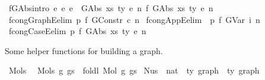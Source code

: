 \begin{isabellebody}
{\isacharbar}{\kern0pt}\ f{\isacharunderscore}{\kern0pt}GAbs{\isacharbrackleft}{\kern0pt}intro{\isacharbrackright}{\kern0pt}{\isacharcolon}{\kern0pt}\ {\isachardoublequoteopen}e{}\ {\isasymsimeq}e\ e{}\ {\isacharequal}{\kern0pt}{\isacharequal}{\kern0pt}{\isachargreater}{\kern0pt}\ {\isacharparenleft}{\kern0pt}GAbs\ xs\ ty\ e{}{\isacharcomma}{\kern0pt}\ n{\isacharparenright}{\kern0pt}\ {\isasymsimeq}f\ {\isacharparenleft}{\kern0pt}GAbs\ xs\ ty\ e{}{\isacharcomma}{\kern0pt}\ n{\isacharparenright}{\kern0pt}{\isachardoublequoteclose}\isanewline
\isanewline
\isanewline
{}\isamarkupfalse%
\ fcong{\isacharunderscore}{\kern0pt}GraphE{\isacharbrackleft}{\kern0pt}elim{\isacharbang}{\kern0pt}{\isacharbrackright}{\kern0pt}{\isacharcolon}{\kern0pt}\ {\isachardoublequoteopen}p\ {\isasymsimeq}f\ {\isacharparenleft}{\kern0pt}GConstr\ c{\isacharcomma}{\kern0pt}\ n{\isacharparenright}{\kern0pt}{\isachardoublequoteclose}\isanewline
{}\isamarkupfalse%
\ fcong{\isacharunderscore}{\kern0pt}AppE{\isacharbrackleft}{\kern0pt}elim{\isacharbang}{\kern0pt}{\isacharbrackright}{\kern0pt}{\isacharcolon}{\kern0pt}\ \ {\isachardoublequoteopen}p\ {\isasymsimeq}f\ {\isacharparenleft}{\kern0pt}GVar\ i{\isacharcomma}{\kern0pt}\ n{\isacharparenright}{\kern0pt}{\isachardoublequoteclose}\isanewline
{}\isamarkupfalse%
\ fcong{\isacharunderscore}{\kern0pt}CaseE{\isacharbrackleft}{\kern0pt}elim{\isacharbang}{\kern0pt}{\isacharbrackright}{\kern0pt}{\isacharcolon}{\kern0pt}\ {\isachardoublequoteopen}p\ {\isasymsimeq}f\ {\isacharparenleft}{\kern0pt}GAbs\ xs\ ty\ e{}{\isacharcomma}{\kern0pt}\ n{\isacharparenright}{\kern0pt}{\isachardoublequoteclose}%
\begin{isamarkuptext}%
Some helper functions for building a graph.%
\end{isamarkuptext}\isamarkuptrue%
\isamarkupfalse%
\ Mols{}{\isacharcolon}{\kern0pt}\isanewline
\ \ {\isachardoublequoteopen}Mols{}\ g\ gs\ {\isacharequal}{\kern0pt}\ foldl\ Mol\ g\ gs{\isachardoublequoteclose}\isanewline
\isanewline
{}\isamarkupfalse%
\ Nus{}\ {\isacharcolon}{\kern0pt}{\isacharcolon}{\kern0pt}\ {\isachardoublequoteopen}nat\ {\isacharequal}{\kern0pt}{\isachargreater}{\kern0pt}\ {\isacharprime}{\kern0pt}ty\ graph\ {\isacharequal}{\kern0pt}{\isachargreater}{\kern0pt}\ {\isacharprime}{\kern0pt}ty\ graph{\isachardoublequoteclose}\ \isanewline

\end{isabellebody}
